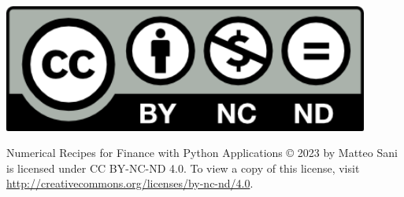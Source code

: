 \thispagestyle{empty}
\cleardoublepage\null
\vspace*{\fill}
\begin{minipage}{0.25\textwidth}
\includegraphics[width=0.9\textwidth]{figures/by-nc-nd}
\end{minipage}
\begin{minipage}{0.75\textwidth}
Numerical Recipes for Finance with Python Applications © 2023 by Matteo Sani is licensed under CC BY-NC-ND 4.0. To view a copy of this license, visit \href{http://creativecommons.org/licenses/by-nc-nd/4.0}{http://creativecommons.org/licenses/by-nc-nd/4.0}.
\end{minipage}
\thispagestyle{empty}

